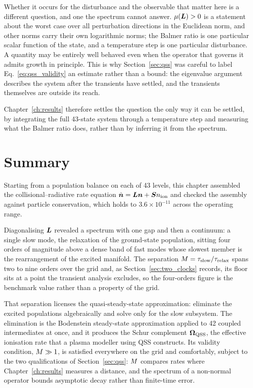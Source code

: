 Whether it occurs for the disturbance and the observable that matter here is a
different question, and one the spectrum cannot answer. $\mu(\bm{L}) > 0$ is a
statement about the worst case over all perturbation directions in the Euclidean
norm, and other norms carry their own logarithmic norms; the Balmer
ratio is one particular scalar function of the state, and a temperature step is
one particular disturbance. A quantity may be entirely well behaved even when
the operator that governs it admits growth in principle. This is why
Section~\ref{sec:qss} was careful to label Eq.~\eqref{eq:qss_validity} an
estimate rather than a bound: the eigenvalue argument describes the system after
the transients have settled, and the transients themselves are outside its
reach.

Chapter~\ref{ch:results} therefore settles the question the only way it can be
settled, by integrating the full 43-state system through a temperature step
and measuring what the Balmer ratio does, rather than by inferring it from the
spectrum.

\section{Summary}
\label{sec:theory_summary}

Starting from a population balance on each of 43 levels, this chapter assembled
the collisional--radiative rate equation $\dot{\bm{n}} = \bm{L}\bm{n} + \bm{S}n_{\mathrm{ion}}$
and checked the assembly against particle conservation, which holds to
$3.6\times10^{-11}$ across the operating range.

Diagonalising $\bm{L}$ revealed a spectrum with one gap and then a continuum: a
single slow mode, the relaxation of the ground-state population, sitting four
orders of magnitude above a dense band of fast modes whose slowest member is the
rearrangement of the excited manifold. The separation $M = \tau_{\mathrm{slow}}/\tau_{\mathrm{relax}}$
spans two to nine orders over the grid and, as Section~\ref{sec:two_clocks}
records, its floor sits at a point the transient analysis excludes, so the
four-orders figure is the benchmark value rather than a property of the grid.

That separation licenses the quasi-steady-state approximation: eliminate the
excited populations algebraically and solve only for the slow subsystem. The
elimination is the Bodenstein steady-state approximation applied to 42 coupled
intermediates at once, and it produces the Schur complement $\bm{\Omega}_{\mathrm{QSS}}$, the
effective ionisation rate that a plasma modeller using QSS constructs. Its
validity condition, $M \gg 1$, is satisfied everywhere on the grid and
comfortably, subject to the two qualifications of Section~\ref{sec:qss}:
$M$ compares rates where Chapter~\ref{ch:results} measures a distance, and
the spectrum of a non-normal operator bounds asymptotic decay rather than
finite-time error.

